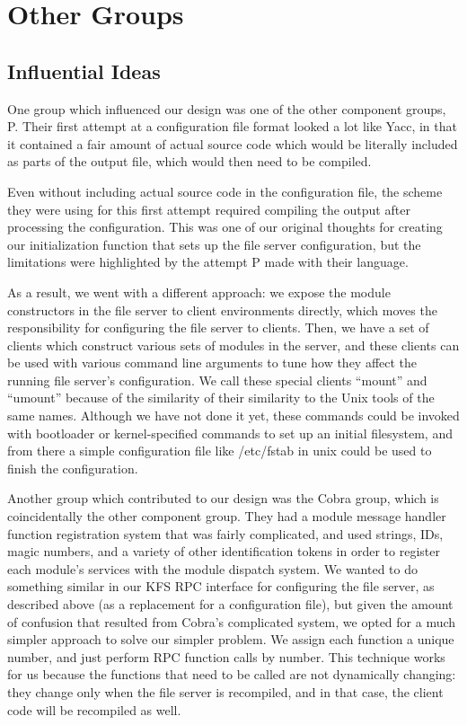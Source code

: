 \section{Other Groups}
\label{sec:groups}

\subsection{Influential Ideas}

One group which influenced our design was one of the other component groups, P.
Their first attempt at a configuration file format looked a lot like Yacc, in
that it contained a fair amount of actual source code which would be literally
included as parts of the output file, which would then need to be compiled.

Even without including actual source code in the configuration file, the scheme
they were using for this first attempt required compiling the output after
processing the configuration. This was one of our original thoughts for creating
our initialization function that sets up the file server configuration, but
the limitations were highlighted by the attempt P made with their language.

As a result, we went with a different approach: we expose the module
constructors in the file server to client environments directly, which moves the
responsibility for configuring the file server to clients. Then, we have a set
of clients which construct various sets of modules in the server, and these
clients can be used with various command line arguments to tune how they affect
the running file server's configuration. We call these special clients ``mount''
and ``umount'' because of the similarity of their similarity to the Unix tools
of the same names. Although we have not done it yet, these commands could be
invoked with bootloader or kernel-specified commands to set up an initial
filesystem, and from there a simple configuration file like /etc/fstab in unix
could be used to finish the configuration.

Another group which contributed to our design was the Cobra group, which is
coincidentally the other component group. They had a module message handler
function registration system that was fairly complicated, and used strings,
IDs, magic numbers, and a variety of other identification tokens in order to
register each module's services with the module dispatch system. We wanted to do
something similar in our KFS RPC interface for configuring the file server, as
described above (as a replacement for a configuration file), but given the
amount of confusion that resulted from Cobra's complicated system, we opted for
a much simpler approach to solve our simpler problem. We assign each function a
unique number, and just perform RPC function calls by number. This technique
works for us because the functions that need to be called are not dynamically
changing: they change only when the file server is recompiled, and in that case,
the client code will be recompiled as well.

